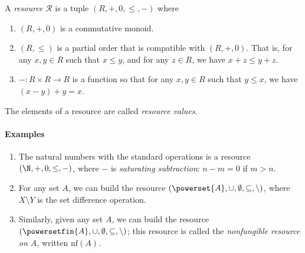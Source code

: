 \documentclass[10pt]{article}
\begin{document}

\begin{definition}
    A \emph{resource} $\mathcal{R}$ is a tuple $(R, +, 0, \leq, -)$ where
    \begin{enumerate}[label=(\roman*)]
        \item $(R, +, 0)$ is a commutative monoid.
        \item $(R, \leq)$ is a partial order that is compatible with $(R, +, 0)$.
            That is, for any $x, y \in R$ such that $x \leq y$, and for any $z \in R$, we have $x + z \leq y + z$.
        \item $- : R \times R \to R$ is a function so that for any $x,y \in R$ such that $y \leq x$, we have $(x - y) + y = x$.

    \end{enumerate}
    The elements of a resource are called \emph{resource values}.
\end{definition}

\paragraph{Examples}

\begin{enumerate}
    \item The natural numbers with the standard operations is a resource $(\N, +, 0, \leq, -)$, where $-$ is \emph{saturating subtraction}: $n - m = 0$ if $m > n$.
    \item For any set $A$, we can build the resource $(\powerset{A}, \cup, \emptyset, \subseteq, \setminus)$, where $X \setminus Y$ is the set difference operation.
    \item Similarly, given any set $A$, we can build the resource $(\powersetfin{A}, \cup, \emptyset, \subseteq, \setminus)$; this resource is called the \emph{nonfungible resource on $A$}, written $\text{nf}(A)$.
\end{enumerate}
\end{document}
